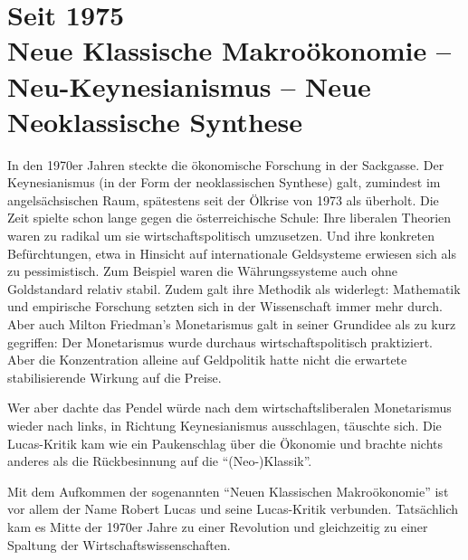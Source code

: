 %
%
%


\part{Seit 1975\\Neue Klassische Makroökonomie -- Neu-Keynesianismus -- Neue Neoklassische Synthese}

In den 1970er Jahren steckte die ökonomische Forschung in der Sackgasse. Der Keynesianismus (in der Form der neoklassischen Synthese) galt, zumindest im angelsächsischen Raum, spätestens seit der Ölkrise von 1973 als überholt. Die Zeit spielte schon lange gegen die österreichische Schule: Ihre liberalen Theorien waren zu radikal um sie wirtschaftspolitisch umzusetzen. Und ihre konkreten Befürchtungen, etwa in Hinsicht auf internationale Geldsysteme erwiesen sich als zu pessimistisch. Zum Beispiel waren die Währungssysteme auch ohne Goldstandard relativ stabil. Zudem galt ihre Methodik als widerlegt: Mathematik und empirische Forschung setzten sich in der Wissenschaft immer mehr durch. Aber auch Milton Friedman's Monetarismus galt in seiner Grundidee als zu kurz gegriffen: Der Monetarismus wurde durchaus wirtschaftspolitisch praktiziert. Aber die Konzentration alleine auf Geldpolitik hatte nicht die erwartete stabilisierende Wirkung auf die Preise.

Wer aber dachte das Pendel würde nach dem wirtschaftsliberalen Monetarismus wieder nach links, in Richtung Keynesianismus ausschlagen, täuschte sich. Die Lucas-Kritik kam wie ein Paukenschlag über die Ökonomie und brachte nichts anderes als die Rückbesinnung auf die "`(Neo-)Klassik"'.

Mit dem Aufkommen der sogenannten "`Neuen Klassischen Makroökonomie"' ist vor allem der Name Robert Lucas und seine Lucas-Kritik \parencite{Lucas1976} verbunden. Tatsächlich kam es Mitte der 1970er Jahre zu einer Revolution und gleichzeitig zu einer Spaltung der Wirtschaftswissenschaften.

